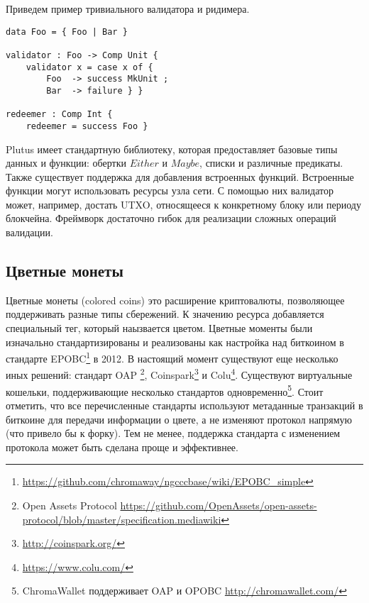 \documentclass[specification,annotation]{itmo-student-thesis}
\begin{document}
Приведем пример тривиального валидатора и ридимера.

\begin{lstlisting}[float=!h,caption={Пример пары валидатор/ридимер на Plutus}]
data Foo = { Foo | Bar }

validator : Foo -> Comp Unit {
    validator x = case x of {
        Foo  -> success MkUnit ;
        Bar  -> failure } }

redeemer : Comp Int {
    redeemer = success Foo }
\end{lstlisting}

Plutus имеет стандартную библиотеку, которая предоставляет базовые
типы данных и функции: обертки $Either$ и $Maybe$, списки и различные
предикаты. Также существует поддержка для добавления встроенных
функций. Встроенные функции могут использовать ресурсы узла сети. С
помощью них валидатор может, например, достать UTXO, относящееся к
конкретному блоку или периоду блокчейна. Фреймворк достаточно гибок
для реализации сложных операций валидации.

\subsection{Цветные монеты}

Цветные монеты (colored coins) это расширение криптовалюты,
позволяющее поддерживать разные типы сбережений. К значению ресурса
добавляется специальный тег, который наызвается цветом. Цветные
моменты были изначально стандартизированы и реализованы как настройка
над биткоином в стандарте
EPOBC\footnote{\url{https://github.com/chromaway/ngcccbase/wiki/EPOBC_simple}}
в 2012. В настоящий момент существуют еще несколько иных решений:
стандарт OAP \footnote{Open Assets Protocol
  \url{https://github.com/OpenAssets/open-assets-protocol/blob/master/specification.mediawiki}},
Coinspark\footnote{\url{http://coinspark.org/}} и
Colu\footnote{\url{https://www.colu.com/}}. Существуют виртуальные
кошельки, поддерживающие несколько стандартов
одновременно\footnote{ChromaWallet поддерживает OAP и OPOBC
  \url{http://chromawallet.com/}}. Стоит отметить, что все
перечисленные стандарты используют метаданные транзакций в биткоине
для передачи информации о цвете, а не изменяют протокол напрямую (что
привело бы к форку). Тем не менее, поддержка стандарта с изменением
протокола может быть сделана проще и эффективнее.
\end{document}
